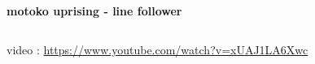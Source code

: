 \documentclass{beamer}
\begin{document}
\begin{frame}{\bf motoko uprising - line follower}  
  \begin{columns}
    \begin{column}{0.5\textwidth}
    \end{column}

    \begin{column}{0.5\textwidth}
    \end{column}
  \end{columns}

  video : \url{https://www.youtube.com/watch?v=xUAJ1LA6Xwc}

\end{frame}
\end{document}
